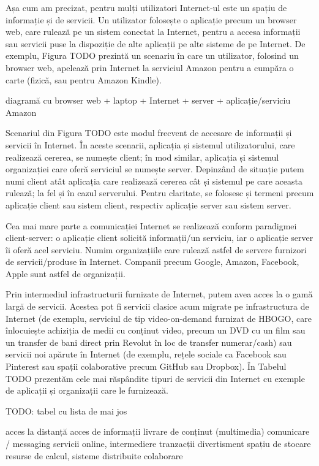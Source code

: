 Așa cum am precizat, pentru mulți utilizatori Internet-ul este un spațiu de informație și de servicii. Un utilizator folosește o aplicație precum un browser web, care rulează pe un sistem conectat la Internet, pentru a accesa informații sau servicii puse la dispoziție de alte aplicații pe alte sisteme de pe Internet. De exemplu, Figura TODO prezintă un scenariu în care un utilizator, folosind un browser web, apelează prin Internet la serviciul Amazon pentru a cumpăra o carte (fizică, sau pentru Amazon Kindle).

diagramă cu browser web + laptop + Internet + server + aplicație/serviciu Amazon

Scenariul din Figura TODO este modul frecvent de accesare de informații și servicii în Internet. În aceste scenarii, aplicația și sistemul utilizatorului, care realizează cererea, se numește client; în mod similar, aplicația și sistemul organizației care oferă serviciul se numește server. Depinzând de situație putem numi client atât aplicația care realizează cererea cât și sistemul pe care aceasta rulează; la fel și în cazul serverului. Pentru claritate, se folosesc și termeni precum aplicație client sau sistem client, respectiv aplicație server sau sistem server.

Cea mai mare parte a comunicației Internet se realizează conform paradigmei client-server: o aplicație client solicită informații/un serviciu, iar o aplicație server îi oferă acel serviciu. Numim organizațiile care rulează astfel de servere furnizori de servicii/produse în Internet. Companii precum Google, Amazon, Facebook, Apple sunt astfel de organizații.

Prin intermediul infrastructurii furnizate de Internet, putem avea acces la o gamă largă de servicii. Acestea pot fi servicii clasice acum migrate pe infrastructura de Internet (de exemplu, serviciul de tip video-on-demand furnizat de HBOGO, care înlocuiește  achiziția de medii cu conținut video, precum un DVD cu un film sau un transfer de bani direct prin Revolut în loc de transfer numerar/cash) sau servicii noi apărute în Internet (de exemplu, rețele sociale ca Facebook sau Pinterest sau spații colaborative precum GitHub sau Dropbox). În Tabelul TODO prezentăm cele mai răspândite tipuri de servicii din Internet cu exemple de aplicații și organizații care le furnizează.

TODO: tabel cu lista de mai jos

acces la distanță
acces de informații
livrare de conținut (multimedia)
comunicare / messaging
servicii online, intermediere tranzacții
divertisment
spațiu de stocare
resurse de calcul, sisteme distribuite
colaborare

